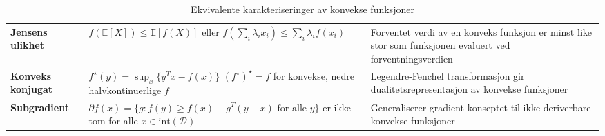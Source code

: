 \begin{table}[H]
\begin{tabular}{|p{3cm}|p{6cm}|p{5cm}|}
		\hline
		\rowcolor{blue!5}
		\multicolumn{3}{|l|}{\textbf{Avanserte karakteriseringer}}                                                             \\
		\hline
		\textbf{Jensens ulikhet}                                        &
		$f(\mathbb{E}[X]) \leq \mathbb{E}[f(X)]$ \newline
		eller $f(\sum_i \lambda_i x_i) \leq \sum_i \lambda_i f(x_i)$    &
		Forventet verdi av en konveks funksjon er minst like stor som funksjonen evaluert ved forventningsverdien              \\
		\hline
		\textbf{Konveks konjugat}                                       &
		$f^\star(y) = \sup_{x} \{y^Tx - f(x)\}$ \newline
		$(f^\star)^\star = f$ for konvekse, nedre halvkontinuerlige $f$ &
		Legendre-Fenchel transformasjon gir dualitetsrepresentasjon av konvekse funksjoner                                     \\
		\hline
		\textbf{Subgradient}                                            &
		$\partial f(x) = \{g : f(y) \geq f(x) + g^T(y-x) \text{ for alle } y\}$ \newline
		er ikke-tom for alle $x \in \text{int}(\mathcal{D})$            &
		Generaliserer gradient-konseptet til ikke-deriverbare konvekse funksjoner                                              \\
		\hline
	\end{tabular}
	\caption{Ekvivalente karakteriseringer av konvekse funksjoner}
	\label{tab:convexity_equivalences}
\end{table}

